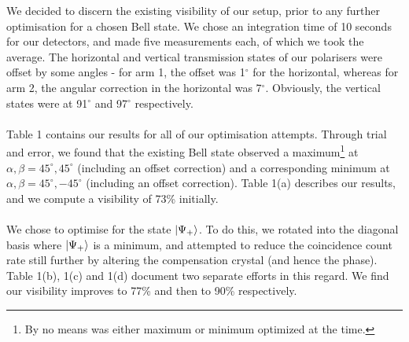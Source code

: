 \documentclass[10pt,a4paper]{article}
\begin{document}
\noindent We decided to discern the existing visibility of our setup, prior to any further optimisation for a chosen Bell state. We chose an integration time of 10 seconds for our detectors, and made five measurements each, of which we took the average. The horizontal and vertical transmission states of our polarisers were offset by some angles - for arm 1, the offset was 1$^{\circ}$ for the horizontal, whereas for arm 2, the angular correction in the horizontal was 7$^{\circ}$. Obviously, the vertical states were at 91$^{\circ}$ and 97$^{\circ}$ respectively.\\
\\
Table 1 contains our results for all of our optimisation attempts. Through trial and error, we found that the existing Bell state observed a maximum\footnote{By no means was either maximum or minimum optimized at the time.} at $\alpha,\beta = 45^{\circ},45^{\circ}$ (including an offset correction) and a corresponding minimum at $\alpha,\beta = 45^{\circ},-45^{\circ}$ (including an offset correction). Table 1(a) describes our results, and we compute a visibility of 73\% initially.\\
\\
We chose to optimise for the state $\ket{\Psi_{+}}$. To do this, we rotated into the diagonal basis where $\ket{\Psi_{+}}$ is a minimum, and attempted to reduce the coincidence count rate still further by altering the compensation crystal (and hence the phase). Table 1(b), 1(c) and 1(d)  document two separate efforts in this regard. We find our visibility improves to 77\% and then to 90\% respectively.
\end{document}
